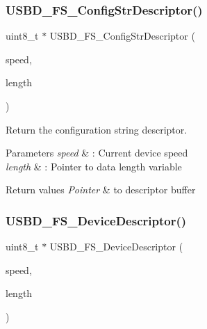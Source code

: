 \subsubsection{\texorpdfstring{U\+S\+B\+D\+\_\+\+F\+S\+\_\+\+Config\+Str\+Descriptor()}{USBD\_FS\_ConfigStrDescriptor()}}
{\footnotesize\ttfamily uint8\+\_\+t $\ast$ U\+S\+B\+D\+\_\+\+F\+S\+\_\+\+Config\+Str\+Descriptor (\begin{DoxyParamCaption}\item[{U\+S\+B\+D\+\_\+\+Speed\+Type\+Def}]{speed,  }\item[{uint16\+\_\+t $\ast$}]{length }\end{DoxyParamCaption})}



Return the configuration string descriptor. 


\begin{DoxyParams}{Parameters}
{\em speed} & \+: Current device speed \\
\hline
{\em length} & \+: Pointer to data length variable \\
\hline
\end{DoxyParams}

\begin{DoxyRetVals}{Return values}
{\em Pointer} & to descriptor buffer \\
\hline
\end{DoxyRetVals}
\mbox{\label{group__USBD__DESC__Private__Functions_ga14798be38c08a37163e53167032485ff}} 
\subsubsection{\texorpdfstring{U\+S\+B\+D\+\_\+\+F\+S\+\_\+\+Device\+Descriptor()}{USBD\_FS\_DeviceDescriptor()}}
{\footnotesize\ttfamily uint8\+\_\+t $\ast$ U\+S\+B\+D\+\_\+\+F\+S\+\_\+\+Device\+Descriptor (\begin{DoxyParamCaption}\item[{U\+S\+B\+D\+\_\+\+Speed\+Type\+Def}]{speed,  }\item[{uint16\+\_\+t $\ast$}]{length }\end{DoxyParamCaption})}



